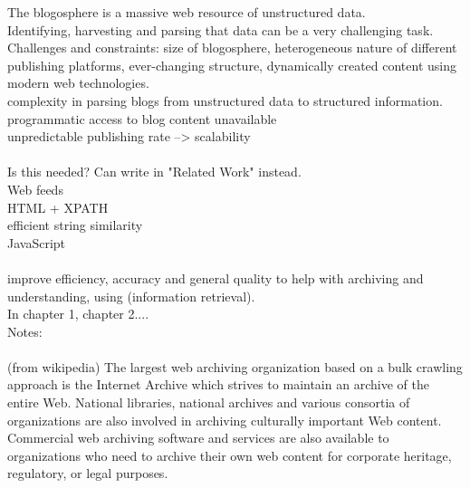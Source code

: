 The blogosphere is a massive web resource of unstructured data.\\
Identifying, harvesting and parsing that data can be a very challenging task.\\
Challenges and constraints: size of blogosphere, heterogeneous nature of different publishing platforms, ever-changing structure, dynamically created content using modern web technologies.\\
complexity in parsing blogs from unstructured data to structured information.\\
programmatic access to blog content unavailable\\
unpredictable publishing rate --> scalability\\
\\
Is this needed? Can write in "Related Work" instead.
\\
Web feeds\\
HTML + XPATH\\
efficient string similarity\\
JavaScript\\
\\
improve efficiency, accuracy and general quality to help with archiving and understanding, using (information retrieval).
\\
In chapter 1, chapter 2....
\\
Notes:\\
\\
(from wikipedia) The largest web archiving organization based on a bulk crawling approach is the Internet Archive which strives to maintain an archive of the entire Web. National libraries, national archives and various consortia of organizations are also involved in archiving culturally important Web content. Commercial web archiving software and services are also available to organizations who need to archive their own web content for corporate heritage, regulatory, or legal purposes.
\\
\\


